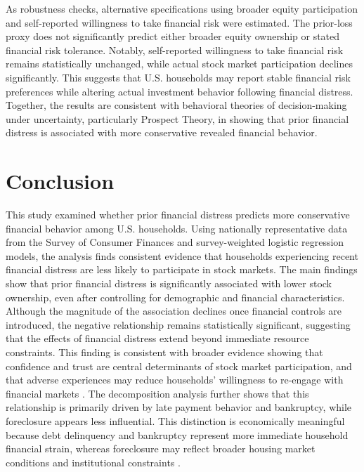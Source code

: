 \documentclass[12pt]{article}
\begin{document}
\medskip
As robustness checks, alternative specifications using broader equity participation and self-reported willingness to take financial risk were estimated. The prior-loss proxy does not significantly predict either broader equity ownership or stated financial risk tolerance. Notably, self-reported willingness to take financial risk remains statistically unchanged, while actual stock market participation declines significantly. This suggests that U.S. households may report stable financial risk preferences while altering actual investment behavior following financial distress. Together, the results are consistent with behavioral theories of decision-making under uncertainty, particularly Prospect Theory, in showing that prior financial distress is associated with more conservative revealed financial behavior.

\section{Conclusion}

This study examined whether prior financial distress predicts more conservative financial behavior among U.S. households. Using nationally representative data from the Survey of Consumer Finances and survey-weighted logistic regression models, the analysis finds consistent evidence that households experiencing recent financial distress are less likely to participate in stock markets. The main findings show that prior financial distress is significantly associated with lower stock ownership, even after controlling for demographic and financial characteristics. Although the magnitude of the association declines once financial controls are introduced, the negative relationship remains statistically significant, suggesting that the effects of financial distress extend beyond immediate resource constraints. This finding is consistent with broader evidence showing that confidence and trust are central determinants of stock market participation, and that adverse experiences may reduce households’ willingness to re-engage with financial markets \cite{guiso2008trust}. The decomposition analysis further shows that this relationship is primarily driven by late payment behavior and bankruptcy, while foreclosure appears less influential. This distinction is economically meaningful because debt delinquency and bankruptcy represent more immediate household financial strain, whereas foreclosure may reflect broader housing market conditions and institutional constraints \cite{mian2015foreclosures}.
\end{document}
